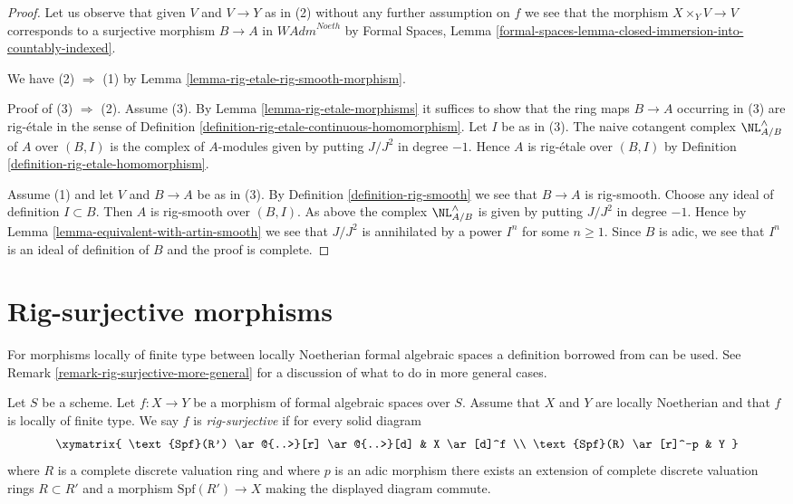 \begin{proof}
Let us observe that given $V$ and $V \to Y$ as in (2) without any
further assumption on $f$ we see that the morphism $X \times_Y V \to V$
corresponds to a surjective morphism $B \to A$ in $\textit{WAdm}^{Noeth}$
by Formal Spaces, Lemma
\ref{formal-spaces-lemma-closed-immersion-into-countably-indexed}.

\medskip\noindent
We have (2) $\Rightarrow$ (1) by
Lemma \ref{lemma-rig-etale-rig-smooth-morphism}.

\medskip\noindent
Proof of (3) $\Rightarrow$ (2). Assume (3). By
Lemma \ref{lemma-rig-etale-morphisms}
it suffices to show that the ring maps
$B \to A$ occurring in (3) are rig-\'etale in the
sense of Definition \ref{definition-rig-etale-continuous-homomorphism}.
Let $I$ be as in (3). The naive cotangent complex
$\NL_{A/B}^\wedge$ of $A$ over $(B, I)$ is the complex of $A$-modules
given by putting $J/J^2$ in degree $-1$. Hence $A$ is
rig-\'etale over $(B, I)$ by
Definition \ref{definition-rig-etale-homomorphism}.

\medskip\noindent
Assume (1) and let $V$ and $B \to A$ be as in (3).
By Definition \ref{definition-rig-smooth} we see that
$B \to A$ is rig-smooth. Choose any ideal of definition $I \subset B$.
Then $A$ is rig-smooth over $(B, I)$.
As above the complex $\NL_{A/B}^\wedge$ is 
given by putting $J/J^2$ in degree $-1$.
Hence by Lemma \ref{lemma-equivalent-with-artin-smooth}
we see that $J/J^2$ is annihilated by
a power $I^n$ for some $n \geq 1$. Since $B$ is adic, we see
that $I^n$ is an ideal of definition of $B$ and the
proof is complete.
\end{proof}














\section{Rig-surjective morphisms}
\label{section-rig-surjective}

\noindent
For morphisms locally of finite type between locally Noetherian formal
algebraic spaces a definition borrowed from \cite{ArtinII} can be used. See
Remark \ref{remark-rig-surjective-more-general} for a discussion
of what to do in more general cases.

\begin{definition}
\label{definition-rig-surjective}
Let $S$ be a scheme. Let $f : X \to Y$ be a morphism of formal
algebraic spaces over $S$. Assume that $X$ and $Y$ are locally
Noetherian and that $f$ is locally of finite type. We say
$f$ is {\it rig-surjective} if for every solid diagram
$$
\xymatrix{
\text{Spf}(R') \ar@{..>}[r] \ar@{..>}[d] & X \ar[d]^f \\
\text{Spf}(R) \ar[r]^-p & Y
}
$$
where $R$ is a complete discrete valuation ring and where
$p$ is an adic morphism there exists an
extension of complete discrete valuation rings $R \subset R'$
and a morphism $\text{Spf}(R') \to X$ making the displayed diagram commute.
\end{definition}

